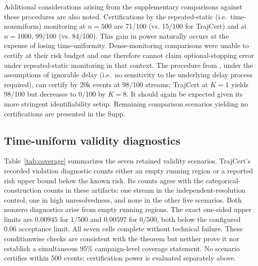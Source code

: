 Additional considerations arising from the supplementary comparisons against these procedures are also noted. Certifications by the repeated-static (i.e.\ time-nonuniform) monitoring at $n = 500$ are 71/100 (vs. 15/100 for TrajCert) and at $n = 1000$, 99/100 (vs. 84/100). This gain in power naturally occurs at the expense of losing time-uniformity. Dense-monitoring comparisons were unable to certify at their risk budget and one therefore cannot claim optional-stopping error under repeated-static monitoring in that context. The procedure from \citet{howard2021}, under the assumptions of ignorable delay (i.e.\ no sensitivity to the underlying delay process required), can certify by 20k events at 98/100 streams; TrajCert at $K=1$ yields 98/100 but decreases to 0/100 by $K=8$. It should again be expected given its more stringent identifiability setup. Remaining comparison scenarios yielding no certifications are presented in the Supp.

\subsection{Time-uniform validity diagnostics}
Table~\ref{tab:coverage} summarizes the seven retained validity scenarios. TrajCert's recorded violation diagnostic counts either an empty running region or a reported risk upper bound below the known risk. Its counts agree with the categorical-construction counts in these artifacts: one stream in the independent-resolution control, one in high unresolvedness, and none in the other five scenarios. Both nonzero diagnostics arise from empty running regions. The exact one-sided upper limits are $0.00945$ for 1/500 and $0.00597$ for 0/500, both below the configured 0.06 acceptance limit. All seven cells complete without technical failure. These conditionwise checks are consistent with the theorem but neither prove it nor establish a simultaneous 95\% campaign-level coverage statement. No scenario certifies within 500 events; certification power is evaluated separately above.

\begin{table}[!htbp]\centering
\caption{Time-uniform validity diagnostics through 500 matured events per stream, with risk projections at 100-event checkpoints. Each scenario has 500 independent streams. Limits are exact one-sided 95\% limits for the recorded ever-violation event, separately by scenario. The configured acceptance limit is 0.06, while the nominal theoretical level is $\delta=0.05$.}\label{tab:coverage}

\end{table}

